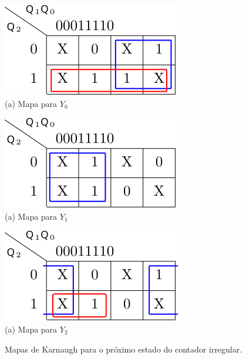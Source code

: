 \documentclass[a4paper]{article}
\begin{document}
\begin{figure}[!htp]
\begin{center}
\begin{minipage}{0.4\textwidth}
\begin{center}
\includegraphics{images/kmap_irr_counter_y0}\\[12pt]
(a) Mapa para $Y_0$
\end{center}
\end{minipage}%
%
\hfill%
%
\begin{minipage}{0.4\textwidth}
\begin{center}
\includegraphics{images/kmap_irr_counter_y1}\\[12pt]
(a) Mapa para $Y_1$
\end{center}
\end{minipage}%

\begin{minipage}{0.4\textwidth}
\begin{center}
\includegraphics{images/kmap_irr_counter_y2}\\[12pt]
(a) Mapa para $Y_2$
\end{center}
\end{minipage}

\caption{Mapas de Karnaugh para o próximo estado do contador irregular.}
\label{fig:irr_counter_karnaugh}
\end{center}
\end{figure}
\end{document}
